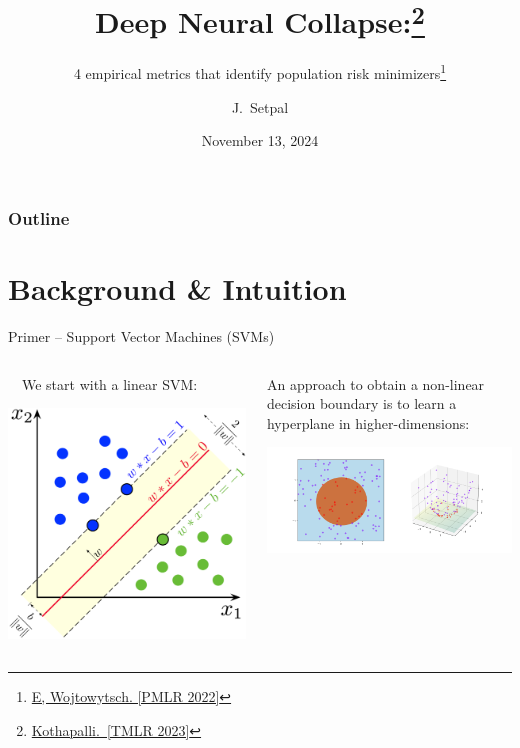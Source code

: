 \documentclass{beamer}
\title[Deep Neural Collapse]{Deep Neural Collapse:\thanks{\href{https://arxiv.org/abs/2206.04041}{Kothapalli.~[TMLR 2023]}}}
\subtitle{4 empirical metrics that identify population risk minimizers\thanks{\href{https://arxiv.org/abs/2012.05420}{E, Wojtowytsch. [PMLR 2022]}}}
\author[ECE ML Reading Group] %
{J.~Setpal}
\date{November 13, 2024}
\begin{document}
\frame{\titlepage}


\begin{frame}
\frametitle{Outline}
\tableofcontents
\end{frame}

\section{Background \& Intuition}
\begin{frame}{Primer -- Support Vector Machines (SVMs)}
	\begin{columns}
		\begin{column}{.5\textwidth}
			~~We start with a linear SVM:
			\begin{center}
				\includegraphics[width=\textwidth]{img/svm.png}
			\end{center} \pause
		\end{column}
		\hspace{1em}
		\begin{column}{.5\textwidth}
			An approach to obtain a non-linear decision boundary is to learn a hyperplane in higher-dimensions:
			\begin{center}
				\includegraphics[width=\textwidth]{img/kernel.png}

\end{center}
\end{column}
\end{columns}
\end{frame}
\end{document}

